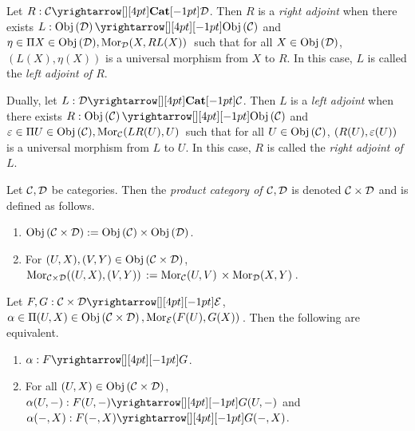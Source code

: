 \begin{dfn}
  \hypertarget{adjoint}{}
  
  Let $R : \map{\CC}{\DD}{\CAT}{}$.
  Then $R$ is a \emph{right adjoint} when 
  there exists $L : \map{\obj{\DD}}{\obj{\CC}}{}{}$ and 
  $\eta \in \Pi {X \in \mathrm{Obj}\left(\mathcal{D}\right)}, \mathrm{Mor}_{\mathcal{D}}(X, RL(X))\,$ such that 
  for all $X\in\mathrm{Obj}\left(\mathcal{D}\right)$, 
  $(L(X),\eta(X))$ is a universal morphism from $X$ to $R$.
  In this case, $L$ is called the \emph{left adjoint of $R$}.
  \newline 
  
  Dually, let $L : \map{\DD}{\CC}{\CAT}{}$.
  Then $L$ is a \emph{left adjoint} when 
  there exists $R : \map{\obj{\CC}}{\obj{\CC}}{}{}$ and 
  $\varepsilon \in \Pi {U \in \mathrm{Obj}\left(\mathcal{C}\right)}, \mathrm{Mor}_{\mathcal{C}}(LR(U), U)\,$ such that 
  for all $U\in\mathrm{Obj}\left(\mathcal{C}\right)$,
  $(R(U),\varepsilon(U))$ is a universal morphism from $L$ to $U$. 
  In this case, $R$ is called the \emph{right adjoint of $L$}.
\end{dfn}

\begin{dfn}
  \hypertarget{product_cat}{}
  
  Let $\mathcal{C}, \mathcal{D}$ be categories. 
  Then the \emph{product category of $\mathcal{C}, \mathcal{D}$} is denoted 
  $\mathcal{C}\times\mathcal{D}$ and is defined as follows. 
  \begin{enumerate}
    \item $\mathrm{Obj}\left(\mathcal{C}\times\mathcal{D}\right) := \mathrm{Obj}\left(\mathcal{C}\right)\times\mathrm{Obj}\left(\mathcal{D}\right)$.
    \item For $(U,X), (V,Y) \in \mathrm{Obj}\left(\mathcal{C}\times\mathcal{D}\right)$, 
    $\mathrm{Mor}_{\mathcal{C}\times\mathcal{D}}((U,X), (V,Y))\, := \mathrm{Mor}_{\mathcal{C}}(U, V)\,\times\mathrm{Mor}_{\mathcal{D}}(X, Y)\,$.
  \end{enumerate}
\end{dfn}

\begin{prop}
  \hypertarget{nat_trans_prod_cat}{}
  
  Let $F, G : \map{\CC\times\DD}{\EE}{}{}$, 
  $\alpha \in \Pi (U,X) \in \mathrm{Obj}\left(\mathcal{C}\times\mathcal{D}\right), \mathrm{Mor}_{\mathcal{E}}(F(U), G(X))\,$.
  Then the following are equivalent. 
  \begin{enumerate}
    \item $\al : \map{F}{G}{}{}$.
    \item For all $(U,X) \in \mathrm{Obj}\left(\mathcal{C}\times\mathcal{D}\right)$, 
    $\al(U,-) : \map{F(U,-)}{G(U,-)}{}{}$ and 
    $\al(-,X) : \map{F(-,X)}{G(-,X)}{}{}$.
  \end{enumerate}
\end{prop}

